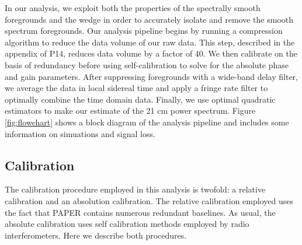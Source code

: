 \documentclass[twocolumn,numberedappendix]{emulateapj} \shorttitle{PSA64}
\begin{document}
In our analysis, we exploit both the properties of the spectrally smooth
foregrounds and the wedge in order to accurately isolate and remove the smooth
spectrum foregrounds.  Our analysis pipeline begins by running a compression
algorithm to reduce the data volume of our raw data. This step, described in the
appendix of P14, reduces data volume by a factor of 40. We
then calibrate on the basis of redundancy before using self-calibration to solve
for the absolute phase and gain parameters. After suppressing foregrounds with a
wide-band delay filter, we average the data in local sidereal time and apply a
fringe rate filter to optimally combine the time domain data. Finally, we use
optimal quadratic estimators to make our estimate of the 21 cm power spectrum.
Figure \ref{fig:flowchart} shows a block diagram of the analysis pipeline and
includes some information on simuations and signal loss.

\subsection{Calibration}\label{sec:calibration}
The calibration procedure employed in this analysis is twofold: a relative
calibration and an absolution calibration. The relative calibration employed
uses the fact that PAPER contains numerous redundant baselines. As usual, the
absolute calibration uses self calibration methods employed by radio
interferometers. Here we describe both procedures.
\end{document}
